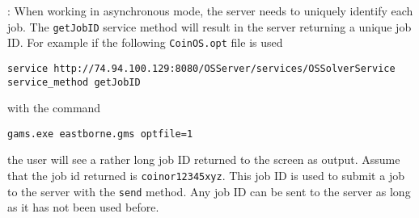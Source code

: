 \vskip 8pt
: When working in asynchronous mode, the server needs to 
uniquely identify each job. The {\tt getJobID} service method will result in the server returning 
a unique job ID. For example if the following {\tt CoinOS.opt} file is used
\vskip 8pt
\begin{verbatim}
service http://74.94.100.129:8080/OSServer/services/OSSolverService
service_method getJobID
\end{verbatim}
with the command
\begin{verbatim}
gams.exe eastborne.gms optfile=1
\end{verbatim}
the user will see a rather long job ID returned to the screen as output. Assume that the job id returned 
is {\tt coinor12345xyz}. This job ID is used to submit a job to the server with the {\tt send} method.
Any job ID can be sent to the server as long as it has not been used before.  

